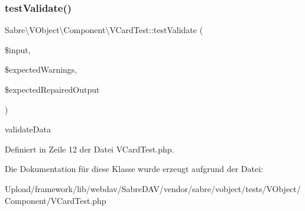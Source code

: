 \subsubsection{\texorpdfstring{test\+Validate()}{testValidate()}}
{\footnotesize\ttfamily Sabre\textbackslash{}\+V\+Object\textbackslash{}\+Component\textbackslash{}\+V\+Card\+Test\+::test\+Validate (\begin{DoxyParamCaption}\item[{}]{\$input,  }\item[{}]{\$expected\+Warnings,  }\item[{}]{\$expected\+Repaired\+Output }\end{DoxyParamCaption})}

validate\+Data 

Definiert in Zeile 12 der Datei V\+Card\+Test.\+php.



Die Dokumentation für diese Klasse wurde erzeugt aufgrund der Datei\+:\begin{DoxyCompactItemize}
\item 
Upload/framework/lib/webdav/\+Sabre\+D\+A\+V/vendor/sabre/vobject/tests/\+V\+Object/\+Component/V\+Card\+Test.\+php\end{DoxyCompactItemize}
